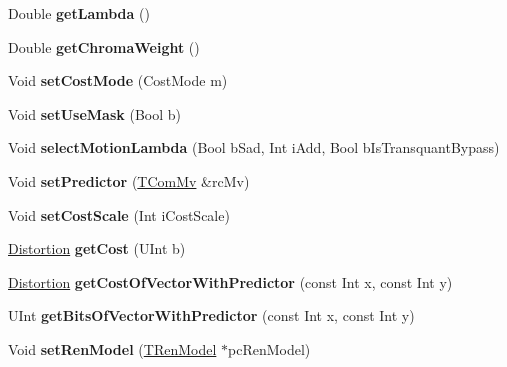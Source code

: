 \begin{DoxyCompactItemize}
Double {\bfseries get\+Lambda} ()
\item 
\mbox{\label{class_t_com_rd_cost_a871489fd2200b885f66f76a62fdca28c}} 
Double {\bfseries get\+Chroma\+Weight} ()
\item 
\mbox{\label{class_t_com_rd_cost_a502731bf175254a1d25619459229c2d3}} 
Void {\bfseries set\+Cost\+Mode} (Cost\+Mode m)
\item 
\mbox{\label{class_t_com_rd_cost_a4bf86fee8413ab6fce69e975212d5ba8}} 
Void {\bfseries set\+Use\+Mask} (Bool b)
\item 
\mbox{\label{class_t_com_rd_cost_a86df589a5c1a17561352e3a1b30eedb1}} 
Void {\bfseries select\+Motion\+Lambda} (Bool b\+Sad, Int i\+Add, Bool b\+Is\+Transquant\+Bypass)
\item 
\mbox{\label{class_t_com_rd_cost_a1c853bb499d6898b9dea2e8f9ca09d03}} 
Void {\bfseries set\+Predictor} (\hyperlink{class_t_com_mv}{T\+Com\+Mv} \&rc\+Mv)
\item 
\mbox{\label{class_t_com_rd_cost_aaf17781b4630eca1bd1c2d5f27117669}} 
Void {\bfseries set\+Cost\+Scale} (Int i\+Cost\+Scale)
\item 
\mbox{\label{class_t_com_rd_cost_af2ca840bbc51b04c2b1e3452eac1ea99}} 
\hyperlink{_type_def_8h_aed82b23ef6849d0bc3d95c92102d5b50}{Distortion} {\bfseries get\+Cost} (U\+Int b)
\item 
\mbox{\label{class_t_com_rd_cost_ad112d2c057568cc6fc95a9a4935ddd8a}} 
\hyperlink{_type_def_8h_aed82b23ef6849d0bc3d95c92102d5b50}{Distortion} {\bfseries get\+Cost\+Of\+Vector\+With\+Predictor} (const Int x, const Int y)
\item 
\mbox{\label{class_t_com_rd_cost_ab5cb37e438f6707979fbb74be36c9a57}} 
U\+Int {\bfseries get\+Bits\+Of\+Vector\+With\+Predictor} (const Int x, const Int y)
\item 
\mbox{\label{class_t_com_rd_cost_a15c20b82fb573e5c0db77ef592430f4c}} 
Void {\bfseries set\+Ren\+Model} (\hyperlink{class_t_ren_model}{T\+Ren\+Model} $\ast$pc\+Ren\+Model)

\end{DoxyCompactItemize}
